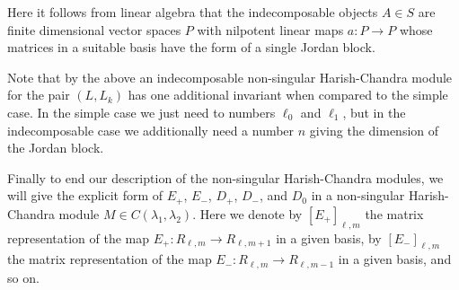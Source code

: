 Here it follows from linear algebra that the indecomposable objects $A\in S$ are finite dimensional vector spaces $P$ with nilpotent linear maps $a\colon P\to P$ whose matrices in a suitable basis have the form of a single Jordan block.

\begin{remark}
  Note that by the above an indecomposable non-singular Harish-Chandra module for the pair $(L,L_k)$ has one additional invariant when compared to the simple case. In the simple case we just need to numbers $\ell_0$ and $\ell_1$, but in the indecomposable case we additionally need a number $n$ giving the dimension of the Jordan block.
\end{remark}

Finally to end our description of the non-singular Harish-Chandra modules, we will give the explicit form of $E_+$, $E_-$, $D_+$, $D_-$, and $D_0$ in a non-singular Harish-Chandra module $M\in C(\lambda_1,\lambda_2)$. Here we denote by $[E_+]_{\ell,m}$ the matrix representation of the map $E_+\colon R_{\ell,m}\to R_{\ell,m+1}$ in a given basis, by $[E_-]_{\ell,m}$ the matrix representation of the map $E_-\colon R_{\ell,m}\to R_{\ell,m-1}$ in a given basis, and so on.

